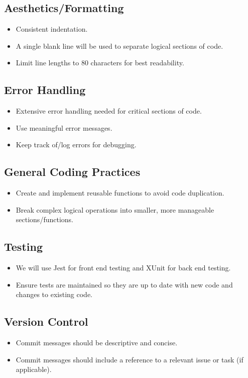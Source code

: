 \documentclass{article}
\begin{document}
	\subsection{Aesthetics/Formatting}
	\begin{itemize}
		\item Consistent indentation.
		\item A single blank line will be used to separate logical sections of code.
		\item Limit line lengths to 80 characters for best readability.
	\end{itemize}

	\subsection{Error Handling}
	\begin{itemize}
		\item Extensive error handling needed for critical sections of code.
		\item Use meaningful error messages.
		\item Keep track of/log errors for debugging.
	\end{itemize}

	\subsection{General Coding Practices}
	\begin{itemize}
		\item Create and implement reusable functions to avoid code duplication.
		\item Break complex logical operations into smaller, more manageable sections/functions.
	\end{itemize}

	\subsection{Testing}
	\begin{itemize}
		\item We will use Jest for front end testing and XUnit for back end testing.
		\item Ensure tests are maintained so they are up to date with new code and changes to existing code.
	\end{itemize}

	\subsection{Version Control}
	\begin{itemize}
		\item Commit messages should be descriptive and concise.
		\item Commit messages should include a reference to a relevant issue or task (if applicable).
	\end{itemize}
\end{document}
